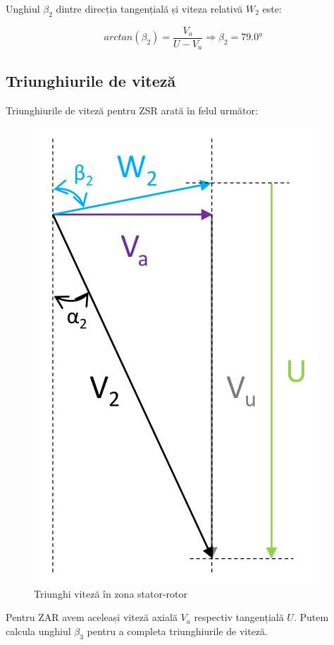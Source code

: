 Unghiul $\beta_2$ dintre direcția tangențială și viteza relativă $W_2$ este:

\begin{equation}
arctan(\beta_{2})=\frac{V_{a}}{U - V_{u}} \Rightarrow \beta_{2} =79.0\si{\degree}
\end{equation}


\subsection{Triunghiurile de viteză}

Triunghiurile de viteză pentru ZSR arată în felul următor:

\begin{figure}[h!]
	\centering
	\includegraphics[scale=0.5]{figures/triunghi_viteza_ZSR.jpg}
	\caption{Triunghi viteză în zona stator-rotor}
	\label{Triunghi viteză în zona stator-rotor}
\end{figure}



Pentru ZAR avem aceleași viteză axială $V_a$ respectiv tangențială $U$. Putem calcula unghiul $\beta_3$ pentru a completa triunghiurile de viteză.

